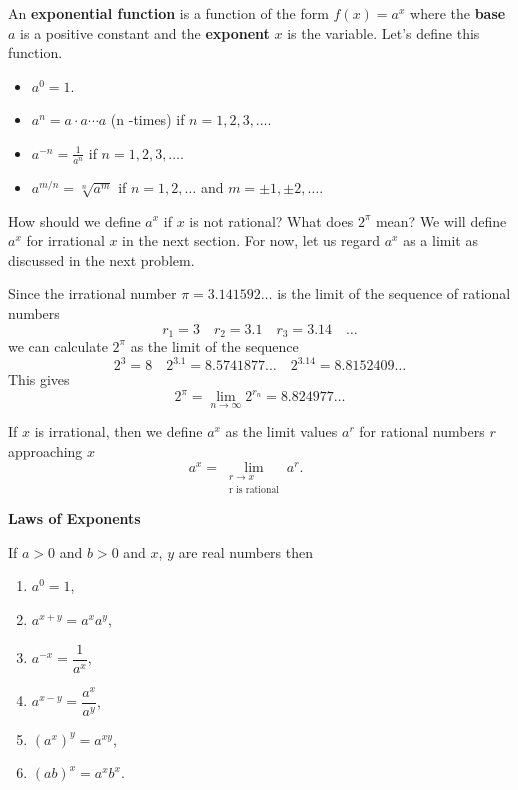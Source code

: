 \documentclass[calc1-main.tex]{subfiles}
\begin{document}
  An \textbf{exponential function} is a function of the form $f(x) = a^x$ where the \textbf{base} $a$ is a positive constant and the \textbf{exponent} $x$ is the variable. Let's define this function.

  \begin{itemize}
    \item $a^0 = 1$.
    \item $a^n = a \cdot a \cdots a$ (n -times) if $n = 1, 2, 3, \dots$.
    \item $a^{-n} = \frac{1}{a^n}$ if $n=1, 2, 3, \dots$.
    \item $a^{m/n} = \sqrt[n]{a^m}$ if $n=1, 2, \dots$ and $m = \pm 1, \pm 2, \dots$.
  \end{itemize}

  How should we define $a^x$ if $x$ is not rational? What does $2^{\pi}$ mean? We will define $a^x$ for irrational $x$ in the next section. For now, let us regard $a^x$ as a limit as discussed in the next problem.

  \begin{example}
    Since the irrational number $\pi = 3.141592\dots$ is the limit of the sequence of rational numbers
    \[
      r_1 = 3 \quad r_2 = 3.1 \quad r_3 = 3.14 \quad \dots
    \]
    we can calculate $2^{\pi}$ as the limit of the sequence
    \[
      2^3 = 8 \quad 2^{3.1} = 8.5741877\dots \quad 2^{3.14} = 8.8152409\dots
    \]
    This gives
    \[
      2^{\pi} = \lim_{n \to \infty} 2^{r_n} = 8.824977\dots
    \]
  \end{example}
  If $x$ is irrational, then we define $a^x$ as the limit values $a^r$ for rational numbers $r$ approaching $x$
  \[
    a^x = \lim_{\substack{r \to x \\ \text{r is rational}}} a^r. \qquad
  \]

  \textbf{Laws of Exponents}

  If $a>0$ and $b>0$ and $x$, $y$ are real numbers then
  \begin{multicols}{2}
    \begin{enumerate}
      \item $a^{0} = 1$,
      \item $a^{x+y} = a^x a^y$,
      \item $a^{-x} = \dfrac{1}{a^x}$,
      \item $a^{x-y} = \dfrac{a^x}{a^y}$,
      \item $(a^x)^y = a^{xy}$,
      \item $(ab)^x = a^x b^x$.
    \end{enumerate}
  \end{multicols}
\end{document}
